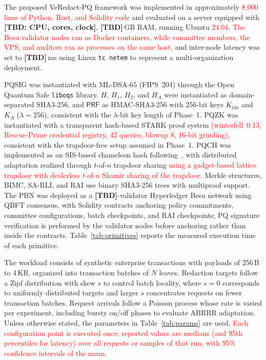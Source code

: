 \documentclass[lettersize,journal]{IEEEtran}
\begin{document}
    The proposed VeRedact-PQ framework was implemented in approximately
    \textcolor{red}{8,000 lines of Python, Rust, and Solidity code} and evaluated on a
    server equipped with \textbf{[TBD: CPU, cores, clock]},
    \textbf{[TBD]}\,GB RAM, running Ubuntu \textcolor{red}{24.04}. \textcolor{red}{The Besu validator nodes ran as Docker containers, while committee members, the VPS, and auditors ran as processes on the same host,} and inter-node latency was set to \textbf{[TBD]}\,ms using
    Linux \texttt{tc netem} to represent a multi-organization deployment.
    
    PQSIG was instantiated with ML-DSA-65 (FIPS~204) through the Open Quantum
    Safe \texttt{liboqs} library. $H$, $H_1$, $H_2$, and $H_A$ were
    instantiated as domain-separated SHA3-256, and $\mathsf{PRF}$ as
    HMAC-SHA3-256 with 256-bit keys $K_{\mathrm{idx}}$
    and $K_A$ { ($\lambda=256$)}, consistent with the {$\lambda$}-bit key length of Phase~1. PQZK was instantiated with a transparent hash-based
    STARK proof system \textcolor{red}{(winterfell~0.13, Rescue-Prime credential registry, 42 queries, blowup 8, 16-bit grinding)}, consistent with the
    trapdoor-free setup assumed in Phase~1. PQCH was implemented as an
    SIS-based chameleon hash following~\cite{ref10,ref17}, with distributed
    adaptation realized through $t$-of-$n$ trapdoor sharing
    \textcolor{red}{using a gadget-based lattice trapdoor with dealerless $t$-of-$n$ Shamir sharing of the trapdoor}. Merkle structures, BIMC, SA-RLI,
    and RAI use binary SHA3-256 trees with multiproof support. The PBN was
    deployed as a \textbf{[TBD]}-validator Hyperledger Besu network using
    QBFT consensus, with Solidity contracts anchoring policy commitments,
    committee configurations, batch checkpoints, and RAI checkpoints; PQ
    signature verification is performed by the validator nodes before
    anchoring rather than inside the contracts. Table~\ref{tab:primitives}
    reports the measured execution time of each primitive.
    
    The workload consists of synthetic enterprise transactions with payloads
    of 256\,B to 4\,KB, organized into transaction batches of $N$ leaves.
    Redaction targets follow a Zipf distribution with skew $s$ to control
    batch locality, where $s=0$ corresponds to uniformly distributed targets
    and larger $s$ concentrates requests on fewer transaction batches.
    Request arrivals follow a Poisson process whose rate is varied per
    experiment, including bursty on/off phases to evaluate ABRRR adaptation.
    Unless otherwise stated, the parameters in Table~\ref{tab:params} are
    used. \textcolor{red}{Each configuration point is executed once; reported values are medians (and 95th percentiles for latency) over all requests or samples of that run, with 95\% confidence intervals of the mean.}
    
\end{document}
